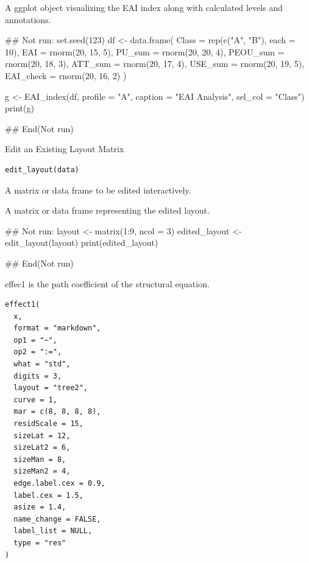 \documentclass[a4paper]{book}
\begin{document}
%
\begin{Value}
A ggplot object visualizing the EAI index along with calculated levels and annotations.
\end{Value}
%
\begin{Examples}
\begin{ExampleCode}
## Not run: 
set.seed(123)
df <- data.frame(
  Class = rep(c("A", "B"), each = 10),
  EAI = rnorm(20, 15, 5),
  PU_sum = rnorm(20, 20, 4),
  PEOU_sum = rnorm(20, 18, 3),
  ATT_sum = rnorm(20, 17, 4),
  USE_sum = rnorm(20, 19, 5),
  EAI_check = rnorm(20, 16, 2)
)

g <- EAI_index(df, profile = "A", caption = "EAI Analysis", sel_col = "Class")
print(g)

## End(Not run)
\end{ExampleCode}
\end{Examples}
%
\begin{Description}
Edit an Existing Layout Matrix
\end{Description}
%
\begin{Usage}
\begin{verbatim}
edit_layout(data)
\end{verbatim}
\end{Usage}
%
\begin{Arguments}
\begin{ldescription}
\item[\code{data}] A matrix or data frame to be edited interactively.
\end{ldescription}
\end{Arguments}
%
\begin{Value}
A matrix or data frame representing the edited layout.
\end{Value}
%
\begin{Examples}
\begin{ExampleCode}
## Not run: 
layout <- matrix(1:9, ncol = 3)
edited_layout <- edit_layout(layout)
print(edited_layout)

## End(Not run)
\end{ExampleCode}
\end{Examples}
%
\begin{Description}
effec1 is the path coefficient of the structural equation.
\end{Description}
%
\begin{Usage}
\begin{verbatim}
effect1(
  x,
  format = "markdown",
  op1 = "~",
  op2 = ":=",
  what = "std",
  digits = 3,
  layout = "tree2",
  curve = 1,
  mar = c(8, 8, 8, 8),
  residScale = 15,
  sizeLat = 12,
  sizeLat2 = 6,
  sizeMan = 8,
  sizeMan2 = 4,
  edge.label.cex = 0.9,
  label.cex = 1.5,
  asize = 1.4,
  name_change = FALSE,
  label_list = NULL,
  type = "res"
)
\end{verbatim}
\end{Usage}
\end{document}
